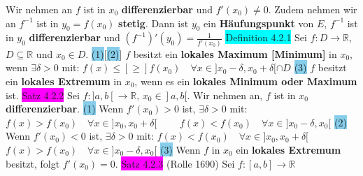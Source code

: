 \documentclass[landscape, 10pt]{article}
\newcommand{\R}{\mathbb{R}}
\begin{document}
\begin{multicols}{3}
                Wir nehmen an \textcolor{NavyBlue}{$f$} ist 
         in \textcolor{NavyBlue}{$x_0$} \textbf{differenzierbar} und 
                \textcolor{NavyBlue}{$f'(x_0)\neq0$}. Zudem nehmen 
                wir an \textcolor{NavyBlue}{$f^{-1}$} ist in \textcolor{NavyBlue}{$y_0=f(x_0)$}
                \textbf{stetig}. Dann ist \textcolor{NavyBlue}{$y_0$} ein 
         \textbf{Häufungspunkt} von \textcolor{NavyBlue}{$E$}, 
                \textcolor{NavyBlue}{$f^{-1}$} ist in \textcolor{NavyBlue}{$y_0$} 
                \textbf{differenzierbar} 
                und \textcolor{NavyBlue}{$(f^{-1})'(y_0)=\frac{1}{f'(x_0)}$}
\colorbox{cyan}{Definition 4.2.1} Sei 
                \textcolor{NavyBlue}{$f:D\longrightarrow\R$},\,
                \textcolor{NavyBlue}{$D\subseteq\R$}
                und \textcolor{NavyBlue}{$x_0\in D$}. 
                \colorbox{SkyBlue}{(1)}[\colorbox{SkyBlue}{(2)}] 
                \textcolor{NavyBlue}{$f$} besitzt ein \textbf{lokales Maximum [Minimum]} in 
         \textcolor{NavyBlue}{$x_0$}, wenn 
                \textcolor{NavyBlue}{$\exists\delta>0$} mit: 
                \textcolor{NavyBlue}{$f(x)\leqslant[\geqslant] f(x_0)\quad
                \forall x\in]x_0-\delta,x_0+\delta[\cap D$} 
         \colorbox{SkyBlue}{(3)} $f$ besitzt ein \textbf{lokales Extremum} 
                in \textcolor{NavyBlue}{$x_0$}, wenn es ein 
                \textbf{lokales Minimum oder Maximum} ist. 
\colorbox{magenta}{Satz 4.2.2} Sei 
                \textcolor{NavyBlue}{$f:]a,b[\longrightarrow\R,\,x_0\in]a,b[$}. 
                Wir nehmen an, \textcolor{NavyBlue}{$f$} ist in 
                \textcolor{NavyBlue}{$x_0$} \textbf{differenzierbar}.
         \colorbox{SkyBlue}{(1)} Wenn \textcolor{NavyBlue}{$f'(x_0)>0$} ist, 
                \textcolor{NavyBlue}{$\exists\delta>0$} mit: 
                \textcolor{NavyBlue}{$f(x)>f(x_0)\quad\forall x\in]x_0,x_0+\delta[\qquad$}
                \textcolor{NavyBlue}{$f(x)<f(x_0)\quad\forall x\in]x_0-\delta,x_0[$} 
         \colorbox{SkyBlue}{(2)} Wenn \textcolor{NavyBlue}{$f'(x_0)<0$} ist, 
                \textcolor{NavyBlue}{$\exists\delta>0$} mit: 
                \textcolor{NavyBlue}{$f(x)<f(x_0)\quad\forall x\in]x_0,x_0+\delta[\qquad$}
                \textcolor{NavyBlue}{$f(x)>f(x_0)\quad\forall x\in]x_0-\delta,x_0[$} 
         \colorbox{SkyBlue}{(3)} Wenn \textcolor{NavyBlue}{$f$} in 
                \textcolor{NavyBlue}{$x_0$} ein \textbf{lokales Extremum} 
                besitzt, folgt \textcolor{NavyBlue}{$f'(x_0)=0$}.
\colorbox{magenta}{Satz 4.2.3} (Rolle 1690) Sei 
                \textcolor{NavyBlue}{$f:[a,b]\longrightarrow\R$}

\end{multicols}
\end{document}
